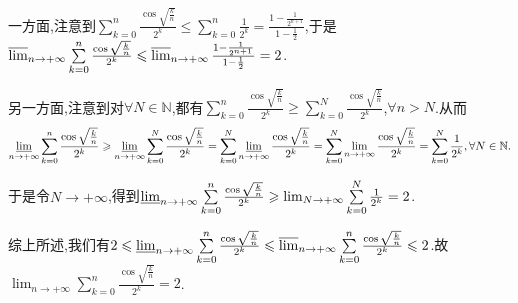 \documentclass[../../main.tex]{subfiles}%
\begin{document}
\begin{solution}

一方面,注意到\(\sum\limits_{k = 0}^{n}\frac{\cos\sqrt{\frac{k}{n}}}{2^k} \leqslant \sum\limits_{k = 0}^{n}\frac{1}{2^k} = \frac{1 - \frac{1}{2^{n + 1}}}{1 - \frac{1}{2}}\),于是
$\varlimsup_{n \to +\infty}\sum\limits_{k = 0}^{n}\frac{\cos\sqrt{\frac{k}{n}}}{2^k} \leqslant \varlimsup_{n \to +\infty}\frac{1 - \frac{1}{2^{n + 1}}}{1 - \frac{1}{2}} = 2$.

另一方面,注意到对\(\forall N \in \mathbb{N}\),都有\(\sum\limits_{k = 0}^{n}\frac{\cos\sqrt{\frac{k}{n}}}{2^k} \geqslant \sum\limits_{k = 0}^{N}\frac{\cos\sqrt{\frac{k}{n}}}{2^k}\),$\forall n>N$.从而
\begin{align*}
\varliminf_{n \to +\infty}\sum\limits_{k = 0}^{n}\frac{\cos\sqrt{\frac{k}{n}}}{2^k} \geqslant \varliminf_{n \to +\infty}\sum\limits_{k = 0}^{N}\frac{\cos\sqrt{\frac{k}{n}}}{2^k} = \sum\limits_{k = 0}^{N}\varliminf_{n \to +\infty}\frac{\cos\sqrt{\frac{k}{n}}}{2^k} = \sum\limits_{k = 0}^{N}\lim_{n \to +\infty}\frac{\cos\sqrt{\frac{k}{n}}}{2^k} = \sum\limits_{k = 0}^{N}\frac{1}{2^k},\forall N \in \mathbb{N}.
\end{align*}

于是令\(N \to +\infty\),得到\(\varliminf_{n \to +\infty}\sum\limits_{k = 0}^{n}\frac{\cos\sqrt{\frac{k}{n}}}{2^k} \geqslant \lim_{N \to +\infty}\sum\limits_{k = 0}^{N}\frac{1}{2^k} = 2\).

综上所述,我们有\(2 \leqslant \varliminf_{n \to +\infty}\sum\limits_{k = 0}^{n}\frac{\cos\sqrt{\frac{k}{n}}}{2^k} \leqslant \varlimsup_{n \to +\infty}\sum\limits_{k = 0}^{n}\frac{\cos\sqrt{\frac{k}{n}}}{2^k} \leqslant 2\).故\(\lim_{n \to +\infty}\sum\limits_{k = 0}^{n}\frac{\cos\sqrt{\frac{k}{n}}}{2^k} = 2\). 

\end{solution}
\end{document}
